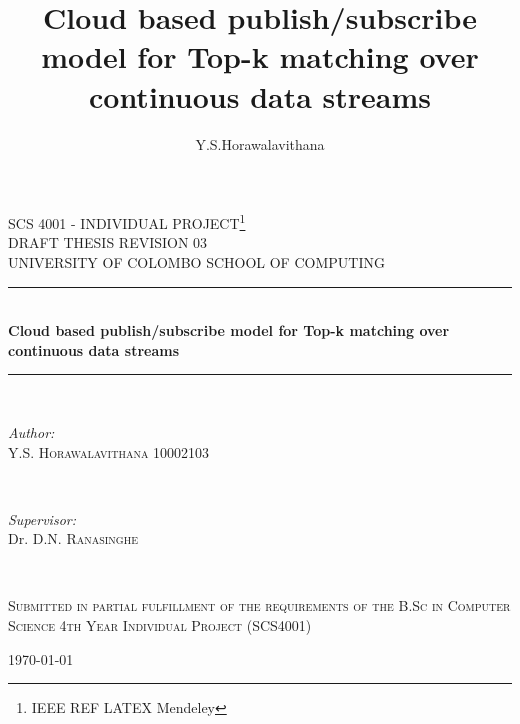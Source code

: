\documentclass[a4paper,12pt,oneside]{book}
\title{Cloud based publish/\-subscribe model for Top-k matching over continuous data streams}
\author{Y.S.Horawalavithana}
\theoremstyle{definition}
\theoremstyle{remark}
\begin{document}
\setcounter{secnumdepth}{5}
\setcounter{tocdepth}{6}



\begin{titlepage}

\newcommand{\HRule}{\rule{\linewidth}{0.5mm}} %

\center 
 
\textsc{\LARGE SCS 4001 - INDIVIDUAL PROJECT\footnote{IEEE REF			LATEX Mendeley}}\\[1.5cm] 
\textsc{\large DRAFT THESIS REVISION 03}\\[0.5cm]
\textsc{\large UNIVERSITY OF COLOMBO SCHOOL OF COMPUTING}\\[0.5cm] %

\HRule \\[0.4cm]
{ \huge \bfseries Cloud based publish/\-subscribe model for Top-k matching over continuous data streams}\\[0.4cm] 
\HRule \\[1.5cm]
 
\begin{minipage}{0.4\textwidth}
\begin{flushleft} \large
\emph{Author:}\\
Y.S. \textsc{Horawalavithana 10002103}
\end{flushleft}
\end{minipage}
~
\begin{minipage}{0.4\textwidth}
\begin{flushright} \large
\emph{Supervisor:} \\
Dr. D.N. \textsc{Ranasinghe} %
\end{flushright}
\end{minipage}\\[3cm]

\begin{minipage}{0.4\textwidth}
\begin{center}
\textsc{\small Submitted in partial fulfillment of the requirements of the B.Sc in Computer Science 4th Year Individual Project (SCS4001)}\newline
\end{center}
\end{minipage}


{\large \today}\\[3cm]
\vfill %
\end{titlepage}
\end{document}
